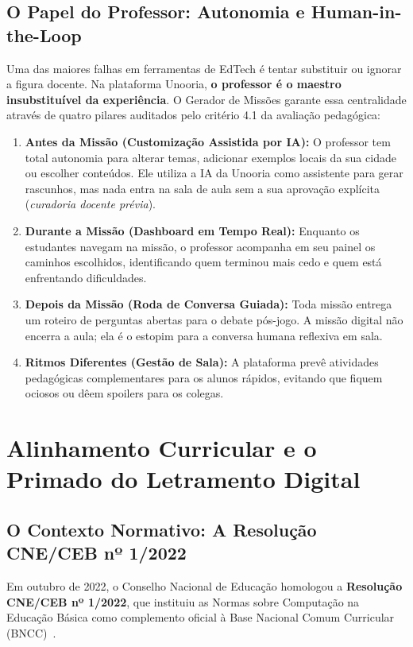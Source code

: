 \documentclass[11pt,a4paper]{article}
\begin{document}
\subsection{O Papel do Professor: Autonomia e Human-in-the-Loop}
Uma das maiores falhas em ferramentas de EdTech é tentar substituir ou ignorar a figura docente. Na plataforma Unooria, \textbf{o professor é o maestro insubstituível da experiência}. O Gerador de Missões garante essa centralidade através de quatro pilares auditados pelo critério 4.1 da avaliação pedagógica:
\begin{enumerate}
  \item \textbf{Antes da Missão (Customização Assistida por IA):} O professor tem total autonomia para alterar temas, adicionar exemplos locais da sua cidade ou escolher conteúdos. Ele utiliza a IA da Unooria como assistente para gerar rascunhos, mas nada entra na sala de aula sem a sua aprovação explícita (\textit{curadoria docente prévia}).
  \item \textbf{Durante a Missão (Dashboard em Tempo Real):} Enquanto os estudantes navegam na missão, o professor acompanha em seu painel os caminhos escolhidos, identificando quem terminou mais cedo e quem está enfrentando dificuldades.
  \item \textbf{Depois da Missão (Roda de Conversa Guiada):} Toda missão entrega um roteiro de perguntas abertas para o debate pós-jogo. A missão digital não encerra a aula; ela é o estopim para a conversa humana reflexiva em sala.
  \item \textbf{Ritmos Diferentes (Gestão de Sala):} A plataforma prevê atividades pedagógicas complementares para os alunos rápidos, evitando que fiquem ociosos ou dêem spoilers para os colegas.
\end{enumerate}

\section{Alinhamento Curricular e o Primado do Letramento Digital}
\label{sec:bncc}

\subsection{O Contexto Normativo: A Resolução CNE/CEB nº 1/2022}
Em outubro de 2022, o Conselho Nacional de Educação homologou a \textbf{Resolução CNE/CEB nº 1/2022}, que instituiu as Normas sobre Computação na Educação Básica como complemento oficial à Base Nacional Comum Curricular (BNCC)~\cite{brasil2018bncc, cne2022computacao}.
\end{document}
